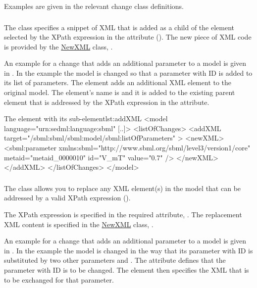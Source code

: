 Examples are given in the relevant change class definitions.


\subsubsection{}
\label{class:addXml}
The  class specifies a snippet of XML that is added as a child of the element selected by the XPath expression in the \hyperref[sec:changeTarget]{} attribute (). The new piece of XML code is provided by the \hyperref[sec:newXml]{NewXML} class, .

An example for a change that adds an additional parameter to a model is given in . In the example the model is changed so that a parameter with ID  is added to its list of parameters. The  element adds an additional XML element to the original model. The element's name is  and it is added to the existing parent element  that is addressed by the XPath expression in the  attribute.

\begin{myXmlLst}{The  element with its  sub-element}{lst:addXML}
<model language="urn:sedml:language:sbml" [..]>
	<listOfChanges>
		<addXML target="/sbml:sbml/sbml:model/sbml:listOfParameters" >
			<newXML>
				<sbml:parameter xmlns:sbml="http://www.sbml.org/sbml/level3/version1/core"
				                metaid="metaid_0000010" id="V_mT" value="0.7" />
			</newXML>
		</addXML>
	</listOfChanges>
</model>
\end{myXmlLst}


\subsubsection{}
\label{class:changeXml}
The  class allows you to replace any XML element(s) in the model that can be addressed by a valid XPath expression ().

The XPath expression is specified in the required \hyperref[sec:changeTarget]{} attribute, . The replacement XML content is specified in the \hyperref[sec:newXml]{NewXML} class, .

An example for a change that adds an additional parameter to a model is given in . In the example the model is changed in the way that its parameter with ID  is substituted by two other parameters  and . The  attribute defines that the parameter with ID  is to be changed. The  element then specifies the XML that is to be exchanged for that parameter.

